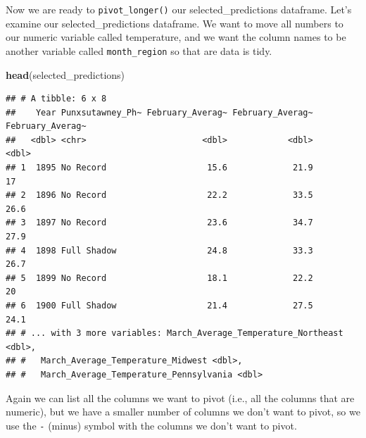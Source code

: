 \documentclass[
]{book}
\newenvironment{Shaded}{\begin{snugshade}}{\end{snugshade}}
\newcommand{\DataTypeTok}[1]{\textcolor[rgb]{0.13,0.29,0.53}{#1}}
\newcommand{\KeywordTok}[1]{\textcolor[rgb]{0.13,0.29,0.53}{\textbf{#1}}}
\newcommand{\NormalTok}[1]{#1}
\newcommand{\OperatorTok}[1]{\textcolor[rgb]{0.81,0.36,0.00}{\textbf{#1}}}
\newcommand{\StringTok}[1]{\textcolor[rgb]{0.31,0.60,0.02}{#1}}
\begin{document}
Now we are ready to \texttt{pivot\_longer()} our selected\_predictions dataframe. Let's examine our selected\_predictions dataframe. We want to move all numbers to our numeric variable called temperature, and we want the column names to be another variable called \texttt{month\_region} so that are data is tidy.

\begin{Shaded}
\begin{Highlighting}[]
\KeywordTok{head}\NormalTok{(selected_predictions)}
\end{Highlighting}
\end{Shaded}

\begin{verbatim}
## # A tibble: 6 x 8
##    Year Punxsutawney_Ph~ February_Averag~ February_Averag~ February_Averag~
##   <dbl> <chr>                       <dbl>            <dbl>            <dbl>
## 1  1895 No Record                    15.6             21.9             17  
## 2  1896 No Record                    22.2             33.5             26.6
## 3  1897 No Record                    23.6             34.7             27.9
## 4  1898 Full Shadow                  24.8             33.3             26.7
## 5  1899 No Record                    18.1             22.2             20  
## 6  1900 Full Shadow                  21.4             27.5             24.1
## # ... with 3 more variables: March_Average_Temperature_Northeast <dbl>,
## #   March_Average_Temperature_Midwest <dbl>,
## #   March_Average_Temperature_Pennsylvania <dbl>
\end{verbatim}

Again we can list all the columns we want to pivot (i.e., all the columns that are numeric), but we have a smaller number of columns we don't want to pivot, so we use the \texttt{-} (minus) symbol with the columns we don't want to pivot.

\begin{Shaded}
\end{Shaded}
\end{document}
